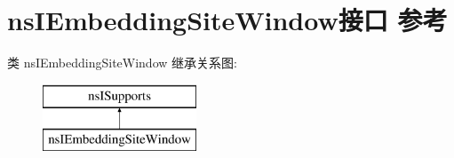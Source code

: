 \hypertarget{interfacens_i_embedding_site_window}{}\section{ns\+I\+Embedding\+Site\+Window接口 参考}
\label{interfacens_i_embedding_site_window}
类 ns\+I\+Embedding\+Site\+Window 继承关系图\+:\begin{figure}[H]
\begin{center}
\leavevmode
\includegraphics[height=2.000000cm]{interfacens_i_embedding_site_window}
\end{center}
\end{figure}
